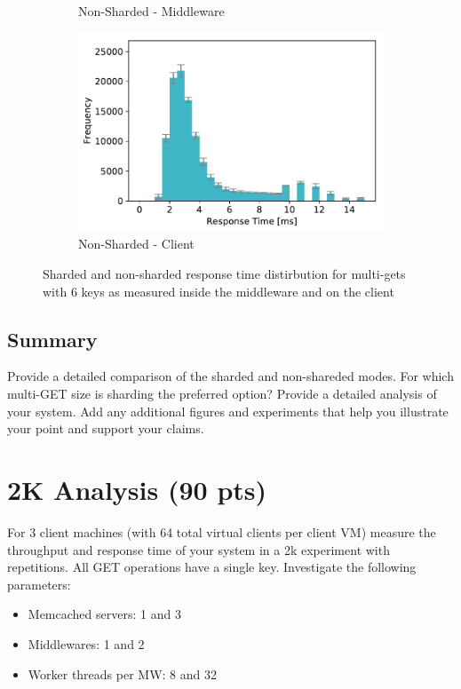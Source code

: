 \documentclass[11pt,a4paper]{article}
\begin{document}
\begin{figure}
\begin{subfigure}[b]{.49\linewidth}
		\caption{Non-Sharded - Middleware}\label{fig1a}
	\end{subfigure}\hfill
	\begin{subfigure}[b]{.49\linewidth}
		\centering
		\includegraphics[width=\linewidth]{data/exp52_nonsharded_mget6_hist_client.pdf}
		\caption{Non-Sharded - Client}\label{fig1b}
	\end{subfigure}%
	\caption{Sharded and non-sharded response time distirbution for multi-gets with 6 keys as measured inside the middleware and on the client}
\end{figure}

\subsection{Summary}

Provide a detailed comparison of the sharded and non-shareded modes. For which multi-GET size is sharding the preferred option? Provide a detailed analysis of your system. Add any additional figures and experiments that help you illustrate your point and support your claims.

\section{2K Analysis (90 pts)}

For 3 client machines (with 64 total virtual clients per client VM) measure the throughput and response time of your system in a 2k experiment with repetitions. All GET operations have a single key. Investigate the following parameters:

\begin{itemize}
		
	\item Memcached servers: 1 and 3
	\item Middlewares: 1 and 2
	\item Worker threads per MW: 8 and 32
	      	      
\end{itemize}
\end{document}

